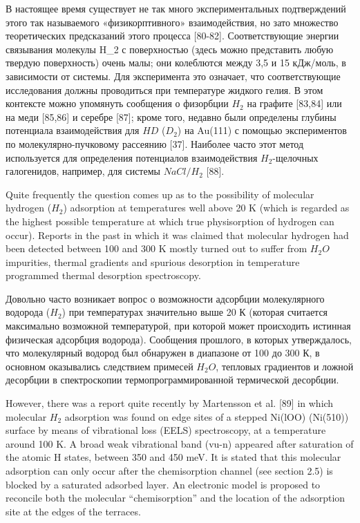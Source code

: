 \documentclass[11pt]{article}
\begin{document}
В настоящее время существует не так много экспериментальных
подтверждений этого так называемого «физикорптивного» взаимодействия, но
зато множество теоретических предсказаний этого процесса {[}80-82{]}.
Соответствующие энергии связывания молекулы H\_2 с поверхностью (здесь
можно представить любую твердую поверхность) очень малы; они колеблются
между 3,5 и 15 кДж/моль, в зависимости от системы. Для эксперимента это
означает, что соответствующие исследования должны проводиться при
температуре жидкого гелия. В этом контексте можно упомянуть сообщения о
физорбции \(H_2\) на графите {[}83,84{]} или на меди {[}85,86{]} и
серебре {[}87{]}; кроме того, недавно были определены глубины потенциала
взаимодействия для \(HD\) (\(D_2\)) на Au(111) с помощью экспериментов
по молекулярно-пучковому рассеянию {[}37{]}. Наиболее часто этот метод
используется для определения потенциалов взаимодействия \(H_2\)-щелочных
галогенидов, например, для системы \(NaCl/H_2\) {[}88{]}.

Quite frequently the question comes up as to the possibility of
molecular hydrogen (\(H_2\)) adsorption at temperatures well above 20 K
(which is regarded as the highest possible temperature at which true
physisorption of hydrogen can occur). Reports in the past in which it
was claimed that molecular hydrogen had been detected between 100 and
300 K mostly turned out to suffer from \(H_2 O\) impurities, thermal
gradients and spurious desorption in temperature programmed thermal
desorption spectroscopy.

Довольно часто возникает вопрос о возможности адсорбции молекулярного
водорода (\(H_2\)) при температурах значительно выше 20 К (которая
считается максимально возможной температурой, при которой может
происходить истинная физическая адсорбция водорода). Сообщения прошлого,
в которых утверждалось, что молекулярный водород был обнаружен в
диапазоне от 100 до 300 К, в основном оказывались следствием примесей
\(H_2 O\), тепловых градиентов и ложной десорбции в спектроскопии
термопрограммированной термической десорбции.

However, there was a report quite recently by Martensson et al. {[}89{]}
in which molecular \(H_2\) adsorption was found on edge sites of a
stepped Ni(lOO) (Ni(510)) surface by means of vibrational loss (EELS)
spectroscopy, at a temperature around 100 K. A broad weak vibrational
band (vu-n) appeared after saturation of the atomic H states, between
350 and 450 meV. It is stated that this molecular adsorption can only
occur after the chemisorption channel (see section 2.5) is blocked by a
saturated adsorbed layer. An electronic model is proposed to reconcile
both the molecular ``chemisorption'' and the location of the adsorption
site at the edges of the terraces.
\end{document}
